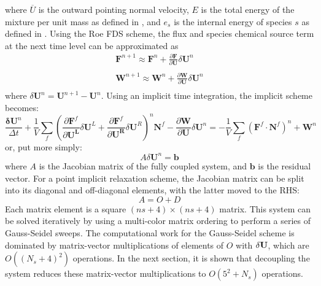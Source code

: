 where $\overline{U}$ is the outward pointing normal velocity, $E$ is
the total energy of the mixture per unit mass as defined in
, and $e_s$ is the internal energy of species $s$ as
defined in .  Using the Roe FDS scheme, the flux and
species chemical source term at the next time level can be approximated as
\begin{equation}
	\begin{matrix}
		\mathbf{F}^{n+1} \approx \mathbf{F}^n+\frac{\partial \mathbf{F}}{\partial \mathbf{U}}\delta\mathbf{U}^n \\
		\\
		\mathbf{W}^{n+1} \approx \mathbf{W}^n+\frac{\partial \mathbf{W}}{\partial \mathbf{U}}\delta\mathbf{U}^n \\
	\end{matrix}
\end{equation}
where $\delta\mathbf{U}^n = \mathbf{U}^{n+1}- \mathbf{U}^{n}$.  Using an
implicit time integration, the implicit scheme becomes:
\begin{equation}
	\frac{\mathbf{\delta U}^n}{\Delta t}+\frac{1}{V}\sum\limits_{f}(\frac{\partial \mathbf{F}^f}{\partial \mathbf{U^L}}\delta\mathbf{U}^L
	+\frac{\partial \mathbf{F}^f}{\partial \mathbf{U^R}}\delta\mathbf{U}^R)^n \mathbf{N}^f
	- \frac{\partial \mathbf{W}}{\partial \mathbf{U}}\delta\mathbf{U}^n
	= -\frac{1}{V}\sum\limits_{f}(\mathbf{F}^f\cdot\mathbf{N}^f)^n + \mathbf{W}^n
\end {equation}
or, put more simply:
\begin{equation}
	A\delta\mathbf{U}^n = \mathbf{b}
\end{equation}
where $A$ is the Jacobian matrix of the fully coupled system, and $\mathbf{b}$
is the residual vector.  For a point implicit relaxation scheme, the Jacobian
matrix can be split into its diagonal and off-diagonal elements, with the latter
moved to the RHS:
\begin{equation}
\label{decomp-jac}
	A=O+D
\end{equation}
Each matrix element is a square $(ns+4)\times(ns+4)$ matrix.  This system can
be solved iteratively by using a multi-color matrix ordering to perform a series
of Gauss-Seidel sweeps. The computational work for the Gauss-Seidel scheme is
dominated by matrix-vector multiplications of elements of $O$ with
$\delta \mathbf U$, which are $O((N_s + 4)^2)$ operations.  In the next
section, it is shown that decoupling the system reduces these matrix-vector
multiplications to $O(5^2 + N_s)$ operations.

